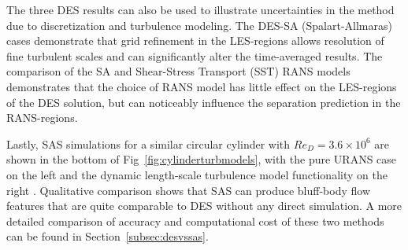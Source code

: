 \documentclass[journal]{new-aiaa}
\begin{document}
The three DES results can also be used to illustrate uncertainties in the method due to discretization and turbulence modeling. The DES-SA (Spalart-Allmaras) cases demonstrate that grid refinement in the LES-regions allows resolution of fine turbulent scales and can significantly alter the time-averaged results. The comparison of the SA and Shear-Stress Transport (SST) RANS models demonstrates that the choice of RANS model has little effect on the LES-regions of the DES solution, but can noticeably influence the separation prediction in the RANS-regions.

Lastly, SAS simulations for a similar circular cylinder with $Re_D=3.6 \times 10^6$ are shown in the bottom of Fig~\ref{fig:cylinderturbmodels}, with the pure URANS case on the left and the dynamic length-scale turbulence model functionality on the right \cite{menter2005scaleadaptive}. Qualitative comparison shows that SAS can produce bluff-body flow features that are quite comparable to DES without any direct simulation. A more detailed comparison of accuracy and computational cost of these two methods can be found in Section~\ref{subsec:desvssas}.
\end{document}
